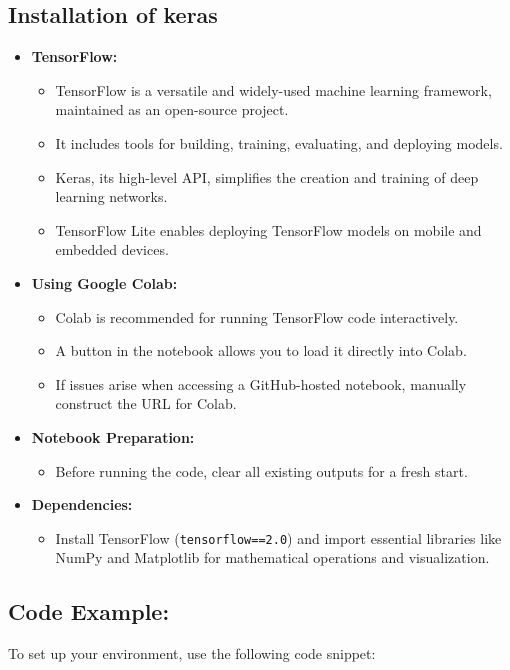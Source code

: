 	 \subsection{Installation of keras}
	\begin{itemize}
		\item \textbf{TensorFlow:}
		\begin{itemize}
			\item TensorFlow is a versatile and widely-used machine learning framework, maintained as an open-source project.
			\item It includes tools for building, training, evaluating, and deploying models.
			\item Keras, its high-level API, simplifies the creation and training of deep learning networks.
			\item TensorFlow Lite enables deploying TensorFlow models on mobile and embedded devices.\cite{Keras:2024}
		\end{itemize}
		\item \textbf{Using Google Colab:}
		\begin{itemize}
			\item Colab is recommended for running TensorFlow code interactively.
			\item A button in the notebook allows you to load it directly into Colab.
			\item If issues arise when accessing a GitHub-hosted notebook, manually construct the URL for Colab.\cite{Keras:2024}
		\end{itemize}
		\item \textbf{Notebook Preparation:}
		\begin{itemize}
			\item Before running the code, clear all existing outputs for a fresh start.
		\end{itemize}
		\item \textbf{Dependencies:}
		\begin{itemize}
			\item Install TensorFlow (\texttt{tensorflow==2.0}) and import essential libraries like NumPy and Matplotlib for mathematical operations and visualization.\cite{Keras:2024}
		\end{itemize}
	\end{itemize}
	
	\subsection{Code Example:}
	To set up your environment, use the following code snippet:
	
